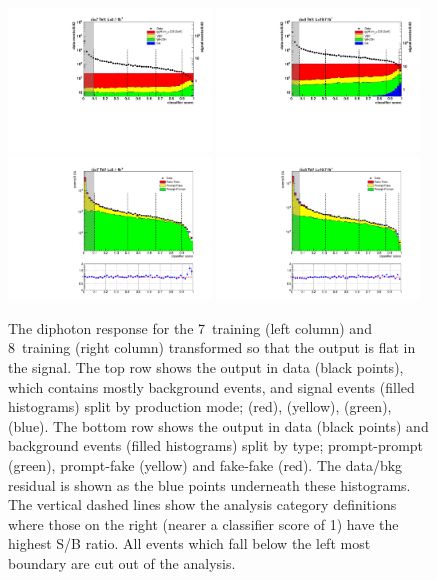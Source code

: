 \begin{figure}
  \includegraphics[width=0.48\textwidth]{selec_and_cats/plots/mixedbdt_transformed_7TeV_fix.pdf} 
  \includegraphics[width=0.48\textwidth]{selec_and_cats/plots/mixedbdt_transformed_8TeV_fix.pdf} \\ 
  \includegraphics[width=0.48\textwidth]{selec_and_cats/plots/diphobdt_transformed_bg_7TeV_fix.pdf}
  \includegraphics[width=0.48\textwidth]{selec_and_cats/plots/diphobdt_transformed_bg_8TeV_fix.pdf}
  \caption[The diphoton \BDT response]{The diphoton \BDT response for the 7~\TeV training (left column) and 8~\TeV training (right column) transformed so that the output is flat in the signal. The top row shows the output in data (black points), which contains mostly background events, and signal \MC events (filled histograms) split by production mode; \ggH (red), \VBF (yellow), \VH (green), \ttH (blue). The bottom row shows the output in data (black points) and background \MC events (filled histograms) split by type; prompt-prompt (green), prompt-fake (yellow) and fake-fake (red). The data/bkg residual is shown as the blue points underneath these histograms. The vertical dashed lines show the analysis category definitions where those on the right (nearer a classifier score of 1) have the highest S/B ratio. All events which fall below the left most boundary are cut out of the analysis.}
  \label{fig:dipho_bdt}
\end{figure}

